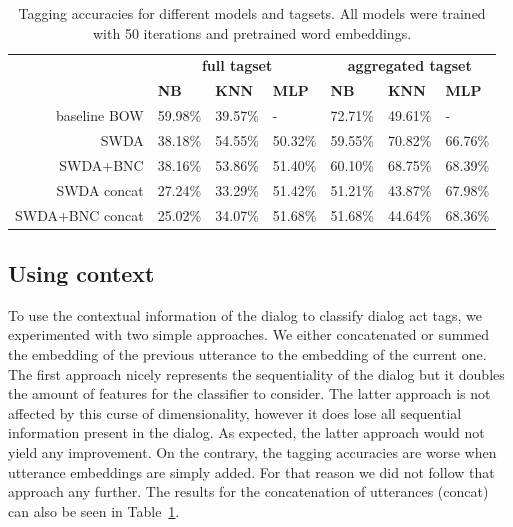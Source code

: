 \begin{table}[]
\centering
\begin{tabular}{r|lll|lll}
                   & \multicolumn{3}{c|}{\textbf{full tagset}} & \multicolumn{3}{c}{\textbf{aggregated tagset}} \\
                   & \textbf{NB}      & \textbf{KNN}     & \textbf{MLP}     & \textbf{NB}     & \textbf{KNN}     & \textbf{MLP}     \\
\hline
baseline BOW      & 59.98\%  & 39.57\% & -       & 72.71\%& 49.61\% &  -         \\
SWDA               & 38.18\%        & 54.55\%        &  50.32\%       &  59.55\%      &  70.82\%       &  66.76\%       \\
SWDA+BNC         & 38.16\%        &  53.86\%       &  51.40\%       &  60.10\%      &  68.75\%       &  68.39\%       \\
SWDA concat      & 27.24\%        & 33.29\%        &  51.42\%       & 51.21\%       &  43.87\%       &  67.98\%       \\
SWDA+BNC concat  & 25.02\%        & 34.07\%        &  51.68\%              & 51.68\%       & 44.64\%        & 68.36\%                \\
\end{tabular}
\caption{Tagging accuracies for different models and tagsets. All models were trained with 50 iterations and pretrained word embeddings.}
\label{tab:results}
\end{table}


\subsection{Using context}
To use the contextual information of the dialog to classify dialog act tags, we experimented with two simple approaches. We either concatenated or summed the embedding of the previous utterance to the embedding of the current one.
The first approach nicely represents the sequentiality of the dialog but it doubles the amount of features for the classifier to consider.
The latter approach is not affected by this curse of dimensionality, however it does lose all sequential information present in the dialog.
As expected, the latter approach would not yield any improvement. On the contrary, the tagging accuracies are worse when utterance embeddings are simply added.
For that reason we did not follow that approach any further.
The results for the concatenation of utterances (concat) can also be seen in Table~\ref{tab:results}.

